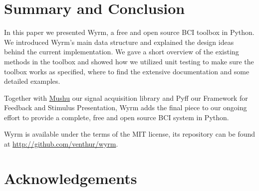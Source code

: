\documentclass[letterpaper,compsoc,twoside]{IEEEtran}
\begin{document}
\section{Summary and Conclusion\label{summary-and-conclusion}}


In this paper we presented Wyrm, a free and open source BCI toolbox in Python.
We introduced Wyrm's main data structure and explained the design ideas behind
the current implementation. We gave a short overview of the existing methods in
the toolbox and showed how we utilized unit testing to make sure the toolbox
works as specified, where to find the extensive documentation and some detailed
examples.

Together with \hyperref[mushu]{Mushu} \cite{Mushu} our signal acquisition library and Pyff \cite{Pyff}
our Framework for Feedback and Stimulus Presentation, Wyrm adds the final piece
to our ongoing effort to provide a complete, free and open source BCI system in
Python.

Wyrm is available under the terms of the MIT license, its repository can be
found at \url{http://github.com/venthur/wyrm}.

\section{Acknowledgements\label{acknowledgements}}
\end{document}
